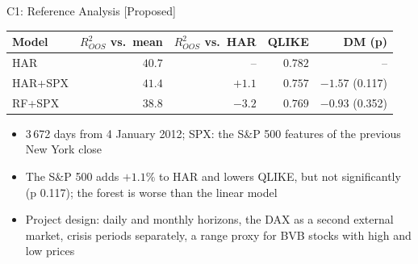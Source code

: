 \ifsolutions
\begin{frame}{C1: Reference Analysis [Proposed]}
\itemsize{\footnotesize}
\begin{center}
\footnotesize
\begin{tabular}{lrrrr}
\toprule
Model & $R^2_{OOS}$ vs.\ mean & $R^2_{OOS}$ vs.\ HAR & QLIKE & DM (p) \\
\midrule
HAR & $40.7$ & -- & $0.782$ & -- \\
HAR+SPX & $41.4$ & ${+1.1}$ & $0.757$ & ${-1.57}$ (0.117) \\
RF+SPX & $38.8$ & ${-3.2}$ & $0.769$ & ${-0.93}$ (0.352) \\
\bottomrule
\end{tabular}
\end{center}
\begin{itemize}
    \item 3\,672 days from 4 January 2012; SPX: the S\&P 500 features of the previous New York close
    \item The S\&P 500 adds $+1.1\%$ to HAR and lowers QLIKE, but not significantly (p 0.117); the forest is worse than the linear model
    \item Project design: daily and monthly horizons, the DAX as a second external market, crisis periods separately, a range proxy for BVB stocks with high and low prices
\end{itemize}
\end{frame}
\fi

